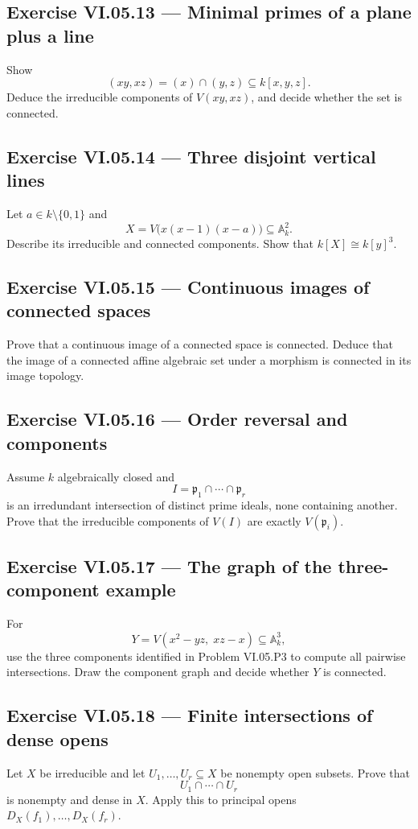 \subsection*{Exercise VI.05.13 --- Minimal primes of a plane plus a line}
\label{ex:vi05-13}
Show
\[
(xy,xz)=(x)\cap(y,z)\subseteq k[x,y,z].
\]
Deduce the irreducible components of \(V(xy,xz)\), and decide whether the set is connected.

\subsection*{Exercise VI.05.14 --- Three disjoint vertical lines}
\label{ex:vi05-14}
Let \(a\in k\setminus\{0,1\}\) and
\[
X=V\bigl(x(x-1)(x-a)\bigr)\subseteq\mathbb A_k^2.
\]
Describe its irreducible and connected components.  Show that \(k[X]\cong k[y]^3\).

\subsection*{Exercise VI.05.15 --- Continuous images of connected spaces}
\label{ex:vi05-15}
Prove that a continuous image of a connected space is connected.  Deduce that the image of
a connected affine algebraic set under a morphism is connected in its image topology.

\subsection*{Exercise VI.05.16 --- Order reversal and components}
\label{ex:vi05-16}
Assume \(k\) algebraically closed and
\[
I=\mathfrak p_1\cap\cdots\cap\mathfrak p_r
\]
is an irredundant intersection of distinct prime ideals, none containing another.  Prove
that the irreducible components of \(V(I)\) are exactly \(V(\mathfrak p_i)\).

\subsection*{Exercise VI.05.17 --- The graph of the three-component example}
\label{ex:vi05-17}
For
\[
Y=V(x^2-yz,\;xz-x)\subseteq\mathbb A_k^3,
\]
use the three components identified in Problem VI.05.P3 to compute all pairwise
intersections.  Draw the component graph and decide whether \(Y\) is connected.

\subsection*{Exercise VI.05.18 --- Finite intersections of dense opens}
\label{ex:vi05-18}
Let \(X\) be irreducible and let \(U_1,\dots,U_r\subseteq X\) be nonempty open subsets.
Prove that
\[
U_1\cap\cdots\cap U_r
\]
is nonempty and dense in \(X\).  Apply this to principal opens
\(D_X(f_1),\dots,D_X(f_r)\).
